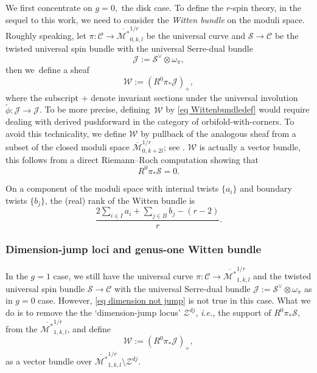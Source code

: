 \documentclass[11pt,a4paper]{article}
\theoremstyle{definition}
\theoremstyle{remark}
\numberwithin{equation}{section}
\def\Mbar{{\overline{\mathcal M}}}
\def\Mbarstar{{\overline{\mathcal M^*}}}
\begin{document}
  

We first concentrate on $g=0,$ the disk case.
To define the $r$-spin theory, in the sequel \cite{TZ2} to this work, we need to consider the \textit{Witten bundle} on the moduli space. Roughly speaking, let $\pi: \mathcal{C} \to \Mbarstar_{0,k,l}^{1/r}$ be the universal curve and $\mathcal{S} \to \mathcal{C}$ be the twisted universal spin bundle with the universal Serre-dual bundle 
\begin{equation}\label{eq universal companion bundle}
\mathcal{J}:= \mathcal{S}^{\vee} \otimes \omega_{\pi},
\end{equation}
then we~define a sheaf
\begin{equation}
\label{eq Wittenbundledef}
{\mathcal{W}}:= (R^0\pi_*\mathcal{J})_+,
\end{equation}
where the subscript $+$ denote invariant sections under the universal involution $\widetilde{\phi}: \mathcal{J} \to \mathcal{J}$.  To be more precise, defining~${\mathcal{W}}$ by \eqref{eq Wittenbundledef} would require dealing with derived pushforward in the category of orbifold-with-corners. To avoid this technicality, we define ${\mathcal{W}}$ by pullback of the analogous sheaf from a subset of the closed moduli space $\Mbar_{0,k+2l}^{1/r}$; see \cite[Section 4.1]{BCT1}. 
$\mathcal W$ is actually a vector bundle, this follows from a direct Riemann--Roch computation showing that 
\begin{equation}\label{eq dimension not jump}
    R^0\pi_*\mathcal{S}=0.
\end{equation}




 On a component of the moduli space with internal twists $\{a_i\}$ and boundary twists $\{b_j\}$, the (real) rank of the Witten bundle is
\begin{equation}\label{eq rank of witten bundle}\frac{2 \sum_{i\in I} a_i + \sum_{j\in B} b_j - (r-2)}{r}.\end{equation}

  
\subsubsection{Dimension-jump loci and genus-one Witten bundle}
In the $g=1$ case, we still have  the universal curve $\pi: \mathcal{C} \to \Mbarstar_{1,k,l}^{1/r}$ and the twisted universal spin bundle $\mathcal{S} \to \mathcal{C}$   with the universal Serre-dual bundle 
$\mathcal{J}:= \mathcal{S}^{\vee} \otimes \omega_{\pi}$
as in $g=0$ case. However,
\eqref{eq dimension not jump} is not true in this case. What we do is to remove the the `dimension-jump locus' $\mathcal Z^{dj}$, \textit{i.e.,} the support of $R^0\pi_*\mathcal S$,  from the $\Mbarstar_{1,k,l}^{1/r}$, and define 
\begin{equation*}
{\mathcal{W}}:= (R^0\pi_*\mathcal{J})_+,
\end{equation*}
as a vector bundle over $\Mbarstar_{1,k,l}^{1/r}\setminus \mathcal Z^{dj}$. 
\end{document}
